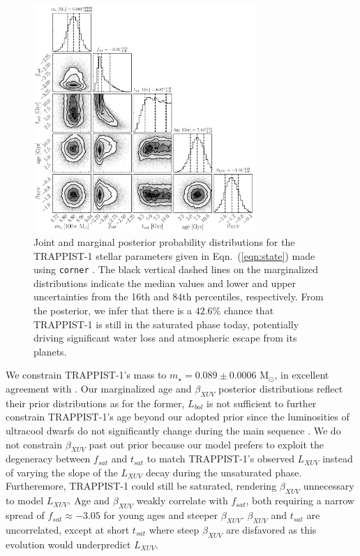 \documentclass[twocolumn]{aastex62}
\begin{document}
\begin{figure}[t]
\centering
	\includegraphics[width=0.75\textwidth]{../Analysis/Corner/trappist1Corner.pdf}
   \caption{Joint and marginal posterior probability distributions for the TRAPPIST-1 stellar parameters given in Eqn.~(\ref{eqn:state}) made using \texttt{corner} \citep{ForemanMackey2016}. The black vertical dashed lines on the marginalized distributions indicate the median values and lower and upper uncertainties from the 16th and 84th percentiles, respectively. From the posterior, we infer that there is a $42.6\%$ chance that TRAPPIST-1 is still in the saturated phase today, potentially driving significant water loss and atmospheric escape from its planets.}%
    \label{fig:corner}%
\end{figure}

We constrain TRAPPIST-1's mass to $m_{\star} = 0.089 \pm{0.0006}$ M$_{\odot}$, in excellent agreement with \citet{vanGrootel2018}. Our marginalized age and $\beta_{XUV}$ posterior distributions reflect their prior distributions as for the former, $L_{bol}$ is not sufficient to further constrain TRAPPIST-1's age beyond our adopted prior since the luminosities of ultracool dwarfs do not significantly change during the main sequence \citep{Baraffe2015}. We do not constrain $\beta_{XUV}$ past out prior because our model prefers to exploit the degeneracy between $f_{sat}$ and $t_{sat}$ to match TRAPPIST-1's observed $L_{XUV}$ instead of varying the slope of the $L_{XUV}$ decay during the unsaturated phase. Furtheremore, TRAPPIST-1 could still be saturated, rendering $\beta_{XUV}$ unnecessary to model $L_{XUV}$. Age and $\beta_{XUV}$ weakly correlate with $f_{sat}$, both requiring a narrow spread of $f_{sat} \approx -3.05$ for young ages and steeper $\beta_{XUV}$. $\beta_{XUV}$ and $t_{sat}$ are uncorrelated, except at short $t_{sat}$ where steep $\beta_{XUV}$ are disfavored as this evolution would underpredict $L_{XUV}$.
\end{document}
